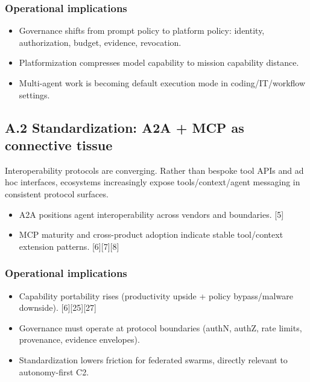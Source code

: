 \documentclass[
]{article}
\providecommand{\tightlist}{%
  \setlength{\itemsep}{0pt}\setlength{\parskip}{0pt}}
\begin{document}
\hypertarget{operational-implications}{%
\subsubsection{Operational
implications}\label{operational-implications}}

\begin{itemize}
\tightlist
\item
  Governance shifts from prompt policy to platform policy: identity,
  authorization, budget, evidence, revocation.
\item
  Platformization compresses model capability to mission capability
  distance.
\item
  Multi-agent work is becoming default execution mode in
  coding/IT/workflow settings.
\end{itemize}

\hypertarget{a.2-standardization-a2a-mcp-as-connective-tissue}{%
\subsection{A.2 Standardization: A2A + MCP as connective
tissue}\label{a.2-standardization-a2a-mcp-as-connective-tissue}}

Interoperability protocols are converging. Rather than bespoke tool APIs
and ad hoc interfaces, ecosystems increasingly expose
tools/context/agent messaging in consistent protocol surfaces.

\begin{itemize}
\tightlist
\item
  A2A positions agent interoperability across vendors and boundaries.
  {[}5{]}
\item
  MCP maturity and cross-product adoption indicate stable tool/context
  extension patterns. {[}6{]}{[}7{]}{[}8{]}
\end{itemize}

\hypertarget{operational-implications-1}{%
\subsubsection{Operational
implications}\label{operational-implications-1}}

\begin{itemize}
\tightlist
\item
  Capability portability rises (productivity upside + policy
  bypass/malware downside). {[}6{]}{[}25{]}{[}27{]}
\item
  Governance must operate at protocol boundaries (authN, authZ, rate
  limits, provenance, evidence envelopes).
\item
  Standardization lowers friction for federated swarms, directly
  relevant to autonomy-first C2.
\end{itemize}
\end{document}
